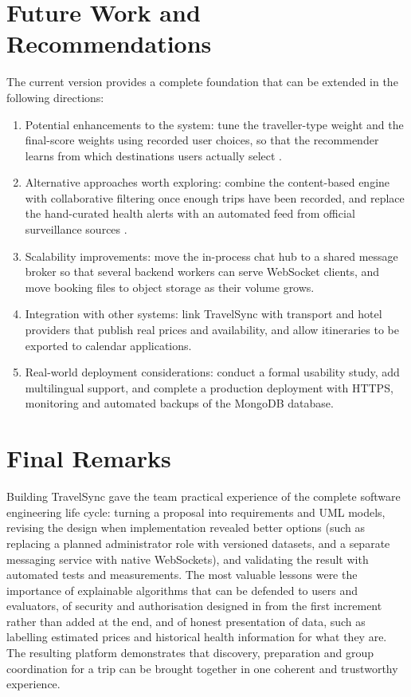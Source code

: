 \section{Future Work and Recommendations}
\label{sec:future-work}

The current version provides a complete foundation that can be extended in
the following directions:

\begin{enumerate}
  \item Potential enhancements to the system: tune the traveller-type
    weight and the final-score weights using recorded user choices, so that
    the recommender learns from which destinations users actually select
    \cite{lops2011content}.
  \item Alternative approaches worth exploring: combine the content-based
    engine with collaborative filtering once enough trips have been
    recorded, and replace the hand-curated health alerts with an automated
    feed from official surveillance sources \cite{idsp}.
  \item Scalability improvements: move the in-process chat hub to a shared
    message broker so that several backend workers can serve WebSocket
    clients, and move booking files to object storage as their volume grows.
  \item Integration with other systems: link TravelSync with transport and
    hotel providers that publish real prices and availability, and allow
    itineraries to be exported to calendar applications.
  \item Real-world deployment considerations: conduct a formal usability
    study, add multilingual support, and complete a production deployment
    with HTTPS, monitoring and automated backups of the MongoDB database.
\end{enumerate}

\section{Final Remarks}

Building TravelSync gave the team practical experience of the complete
software engineering life cycle: turning a proposal into requirements and
UML models, revising the design when implementation revealed better options
(such as replacing a planned administrator role with versioned datasets, and
a separate messaging service with native WebSockets), and validating the
result with automated tests and measurements. The most valuable lessons
were the importance of explainable algorithms that can be defended to users
and evaluators, of security and authorisation designed in from the first
increment rather than added at the end, and of honest presentation of data,
such as labelling estimated prices and historical health information for
what they are. The resulting platform demonstrates that discovery,
preparation and group coordination for a trip can be brought together in one
coherent and trustworthy experience.

